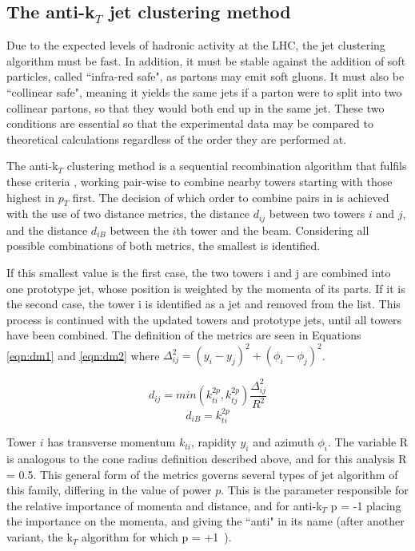 \subsection{The anti-k$_{T}$ jet clustering method}

Due to the expected levels of hadronic activity at the LHC, the jet clustering algorithm must be fast. In addition, it must be stable against the addition of soft particles, called ``infra-red safe", as partons may emit soft gluons. It must also be ``collinear safe", meaning it yields the same jets if a parton were to split into two collinear partons, so that they would both end up in the same jet. These two conditions are essential so that the experimental data may be compared to theoretical calculations regardless of the order they are performed at. 

The anti-k$_{T}$ clustering method \cite{akt} is a sequential recombination algorithm that fulfils these criteria \cite{aktrecom}, working pair-wise to combine nearby towers starting with those highest in $p_{T}$  first. The decision of which order to combine pairs in is achieved with the use of two distance metrics, the distance $d_{ij}$ between two towers $i$ and $j$, and the distance $d_{iB}$ between the $i$th tower and the beam. Considering all possible combinations of both metrics, the smallest is identified. 

If this smallest value is the first case, the two towers i and j are combined into one prototype jet, whose position is weighted by the momenta of its parts. If it is the second case, the tower i is identified as a jet and removed from the list. This process is continued with the updated towers and prototype jets, until all towers have been combined. The definition of the metrics are seen in Equations \ref{eqn:dm1} and \ref{eqn:dm2} where $\Delta_{ij}^{2} = (y_{i}-y_{j})^{2} + (\phi_{i}-\phi_{j})^{2}$. 

 \begin{equation}
d_{ij} = min(k_{ti}^{2p},k_{tj}^{2p})\frac{\Delta_{ij}^{2}}{R^{2}}
\label{eqn:dm1}
\end{equation}
\begin{equation}
d_{iB} = k_{ti}^{2p}
\label{eqn:dm2}
\end{equation}

Tower $i$ has transverse momentum $k_{ti}$, rapidity $y_{i}$ and azimuth $\phi_{i}$. The variable R is analogous to the cone radius definition described above, and for this analysis R = 0.5. This general form of the metrics governs several types of jet algorithm of this family, differing in the value of power $p$. This is the parameter responsible for the relative importance of momenta and distance, and for anti-k$_{T}$ p = -1 placing the importance on the momenta, and giving the ``anti" in its name (after another variant, the k$_{T}$ algorithm for which p = +1~\cite{kt}).

